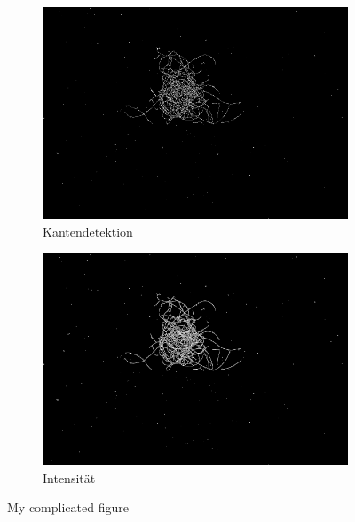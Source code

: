 \documentclass[german,a4paper, 12pt]{llncs}
\begin{document}
\begin{figure}[H]
	\medskip
	\begin{subfigure}{0.48\textwidth}
		\includegraphics[width=\linewidth]{figBina/04edges.png}
		\caption{Kantendetektion} \label{fig:e}
	\end{subfigure}\hspace*{\fill}
	\begin{subfigure}{0.48\textwidth}
		\includegraphics[width=\linewidth]{figBina/05intenstiy.png}
		\caption{Intensität} \label{fig:f}
	\end{subfigure}
	
	
	\caption{My complicated figure} \label{fig:1}
\end{figure}
\end{document}
